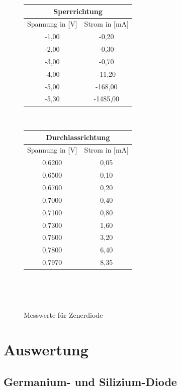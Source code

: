 \documentclass[fontsize=12pt]{scrartcl}
\begin{document}
\begin{figure}[H]
\caption{Messwerte für Zenerdiode}
\begin{minipage}{0.5\textwidth}
\vspace{-15pt}
\centering
\begin{tabular}{|c|c|} \hline
\multicolumn{2}{|c|}{ Sperrrichtung	}\\ \hline
Spannung in [V]	& Strom in  [mA] \\ \hline
-1,00	&-0,20\\ \hline
-2,00	&-0,30\\ \hline
-3,00	&-0,70\\ \hline
-4,00	&-11,20\\ \hline
-5,00	&-168,00\\ \hline
-5,30	&-1485,00\\ \hline
\end{tabular} \\
\end{minipage}
\begin{minipage}{0.2\textwidth}
\centering
\begin{tabular}{|c|c|} \hline
\multicolumn{2}{|c|}{ Durchlassrichtung}	\\ \hline
Spannung in [V]	& Strom in  [mA] \\ \hline
0,6200&	0,05\\ \hline
0,6500&	0,10\\ \hline
0,6700&	0,20\\ \hline
0,7000&	0,40\\ \hline
0,7100&	0,80\\ \hline
0,7300&	1,60\\ \hline
0,7600&	3,20\\ \hline
0,7800&	6,40\\ \hline
0,7970&	8,35\\ \hline
\end{tabular} \\
\end{minipage}\\
\end{figure}

\newpage

\section{ Auswertung}

\subsection{Germanium- und Silizium-Diode}
\end{document}
